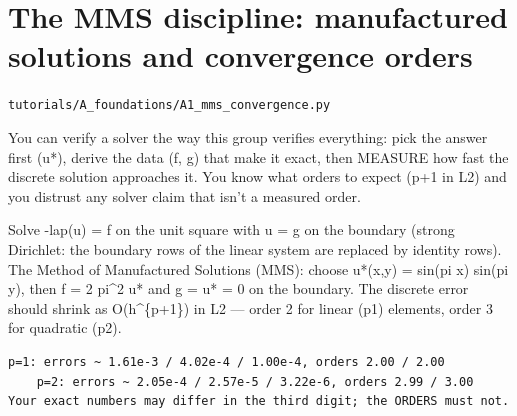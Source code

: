 \chapter{The MMS discipline: manufactured solutions and convergence orders}
\label{ch:A1_mms_convergence}
\noindent\texttt{tutorials/A\_foundations/A1\_mms\_convergence.py}\\[0.75em]
\begin{outcome}
You can verify a solver the way this group verifies
everything: pick the answer first (u*), derive the data (f, g) that make it
exact, then MEASURE how fast the discrete solution approaches it. You know
what orders to expect (p+1 in L2) and you distrust any solver claim that
isn't a measured order.
\end{outcome}

Solve -lap(u) = f on the unit square with u = g on the boundary
(strong Dirichlet: the boundary rows of the linear system are replaced by
identity rows). The Method of Manufactured Solutions (MMS): choose
u*(x,y) = sin(pi x) sin(pi y), then f = 2 pi\textasciicircum{}2 u* and g = u* = 0 on the
boundary. The discrete error should shrink as O(h\textasciicircum{}\{p+1\}) in L2 — order 2
for linear (p1) elements, order 3 for quadratic (p2).

\begin{expected}
\begin{verbatim}
p=1: errors ~ 1.61e-3 / 4.02e-4 / 1.00e-4, orders 2.00 / 2.00
    p=2: errors ~ 2.05e-4 / 2.57e-5 / 3.22e-6, orders 2.99 / 3.00
Your exact numbers may differ in the third digit; the ORDERS must not.
\end{verbatim}
\end{expected}

